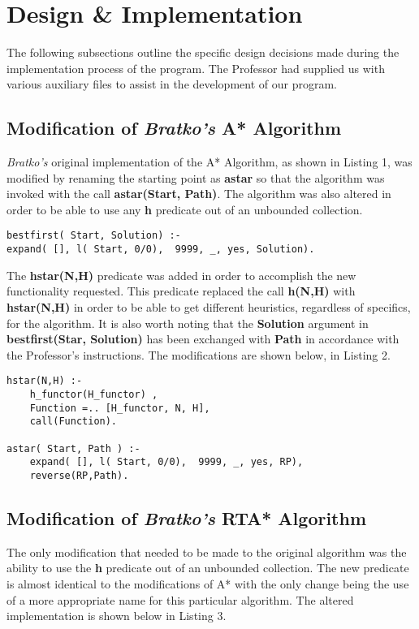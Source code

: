 \documentclass[11pt]{article}
\newcommand{\forceindent}{\leavevmode{\parindent=1em\indent}}
\begin{document}
\section{Design \& Implementation}
\forceindent The following subsections outline the specific design decisions made during the implementation process of the program. The Professor had supplied us with various auxiliary files to assist in the development of our program.
\subsection{Modification of \emph{Bratko's} A* Algorithm}
\forceindent \emph{Bratko's} original implementation of the A* Algorithm, as shown in Listing 1, was modified by renaming the starting point as \textbf{astar} so that the algorithm was invoked with the call \textbf{astar(Start, Path)}. The algorithm was also altered in order to be able to use any \textbf{h} predicate out of an unbounded collection. 
\begin{lstlisting}
bestfirst( Start, Solution) :-
expand( [], l( Start, 0/0),  9999, _, yes, Solution).	
\end{lstlisting}
\vspace{2 mm}

\forceindent The \textbf{hstar(N,H)} predicate was added in order to accomplish the new functionality requested. This predicate replaced the call \textbf{h(N,H)} with \textbf{hstar(N,H)} in order to be able to get different heuristics, regardless of specifics, for the algorithm. It is also worth noting that the \textbf{Solution} argument in \textbf{bestfirst(Star, Solution)} has been exchanged with \textbf{Path} in accordance with the Professor's instructions. The modifications are shown below, in Listing 2.

\begin{lstlisting}
hstar(N,H) :-
    h_functor(H_functor) , 
    Function =.. [H_functor, N, H],
    call(Function).

astar( Start, Path ) :-
    expand( [], l( Start, 0/0),  9999, _, yes, RP),
    reverse(RP,Path).	
\end{lstlisting}

\subsection{Modification of \emph{Bratko's} RTA* Algorithm}
\forceindent The only modification that needed to be made to the original algorithm was the ability to use the \textbf{h} predicate out of an unbounded collection. The new predicate is almost identical to the modifications of A* with the only change being the use of a more appropriate name for this particular algorithm. The altered implementation is shown below in Listing 3.  
\end{document}
